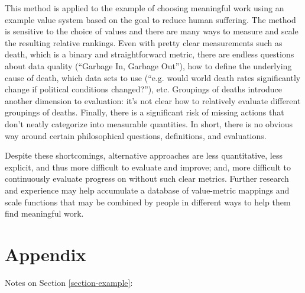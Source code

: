 \documentclass[10pt, a4paper, twocolumn]{IEEEconf}
\begin{document}
This method is applied to the example of choosing meaningful work using an example value system based on the goal to reduce human suffering.
The method is sensitive to the choice of values and there are many ways to measure and scale the resulting relative rankings.
Even with pretty clear measurements such as death, which is a binary and straightforward metric, there are endless questions about data quality (\enquote{Garbage In, Garbage Out}), how to define the underlying cause of death, which data sets to use (\enquote{e.g. would world death rates significantly change if political conditions changed?}), etc.
Groupings of deaths introduce another dimension to evaluation: it's not clear how to relatively evaluate different groupings of deaths.
Finally, there is a significant risk of missing actions that don't neatly categorize into measurable quantities.
In short, there is no obvious way around certain philosophical questions, definitions, and evaluations.

Despite these shortcomings, alternative approaches are less quantitative, less explicit, and thus more difficult to evaluate and improve; and, more difficult to continuously evaluate progress on without such clear metrics. Further research and experience may help accumulate a database of value-metric mappings and scale functions that may be combined by people in different ways to help them find meaningful work.




\newpage
\clearpage

\section{Appendix}

Notes on Section \ref{section-example}:
\end{document}
